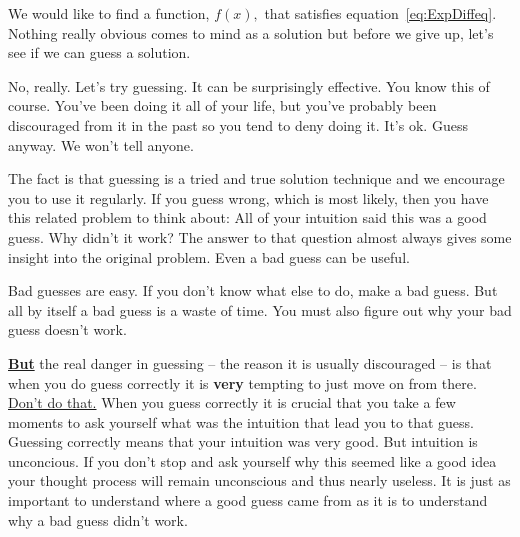 





We would like to find a function, $f(x),$ that satisfies
equation~\ref{eq:ExpDiffeq}. Nothing really obvious comes to mind as a
solution but before we give up, let's see if we can 
guess a solution.

No, really. Let's try guessing. It can be surprisingly effective. You
know this of course. You've been doing it all of your life, but you've
probably been discouraged from it in the past so you tend to deny
doing it. It's ok. Guess anyway. We won't tell anyone.

The fact is that guessing is a tried and true solution technique and
we encourage you to use it regularly. If you guess wrong, which is
most likely, then you have this related problem to think about:
All of your intuition said this was a good guess.  Why didn't it work?
The answer to that question almost always gives some insight into the
original problem.  Even a bad guess can be useful. 

Bad guesses are
easy. If you don't know what else to do, make a bad guess. But all by
itself a bad guess is a waste of time. You must also figure out why
your bad guess doesn't work.

\underline{\Large\bf But} the real danger in guessing -- the reason
it is usually discouraged -- is that when you do guess correctly
it is {\bf very} tempting to just move on from there. \underline{Don't
  do that.} When you guess correctly it is crucial that you take a few
moments to ask yourself what was the intuition that lead you to that
guess. Guessing correctly means that your intuition was very good. But
intuition is unconcious. If you don't stop and ask yourself why this
seemed like a good idea your thought process will remain unconscious
and thus nearly useless. It  is just as important to understand where a good
guess came from  as it is to understand why a bad guess didn't work.

